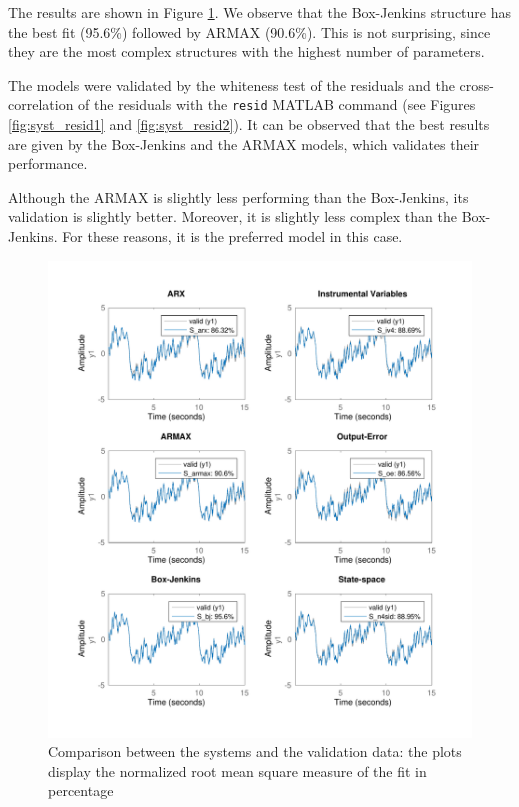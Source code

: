 \documentclass[a4paper,11pt]{article}
\begin{document}
The results are shown in Figure \ref{fig:syst_compare}. We observe that the Box-Jenkins structure has the best fit  (95.6\%) followed by ARMAX (90.6\%). This is not surprising, since they are the most complex structures with the highest number of parameters. 

The models were validated by the whiteness test of the residuals and the cross-correlation of the residuals with the \verb'resid' MATLAB command (see Figures \ref{fig:syst_resid1} and \ref{fig:syst_resid2}). It can be observed that the best results are given by the Box-Jenkins and the ARMAX models, which validates their performance. 

Although the ARMAX is slightly less performing than the Box-Jenkins, its validation is slightly better. Moreover, it is slightly less complex than the Box-Jenkins.
For these reasons, it is the preferred model in this case.

\begin{figure}[H]
\centering
\includegraphics[width=\textwidth]{images/ce3_5_2_system_compare}
\caption{Comparison between the systems and the validation data: the plots display the normalized root mean square measure of the fit in percentage}
\label{fig:syst_compare}
\end{figure}
\end{document}
